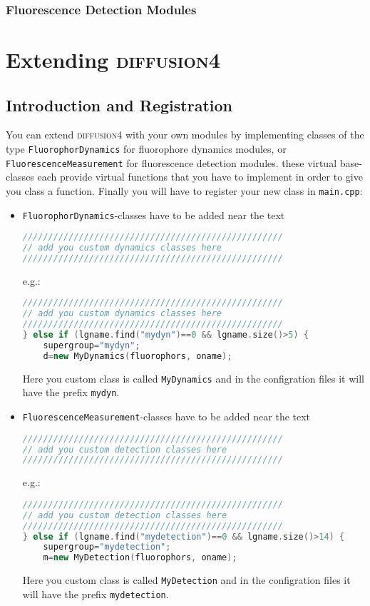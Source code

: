 \documentclass[a4paper,twoside,10pt]{report}
\newcommand{\df}{\textsc{diffusion4}\xspace}
\begin{document}
\subsection{Fluorescence Detection Modules}
\label{sec:DetectionModules}

\chapter{Extending \df}
\label{sec:ExtendingDf}
\section{Introduction and Registration}
\label{sec:IntroductionAndRegistration}

You can extend \df with your own modules by implementing classes of the type \texttt{FluorophorDynamics} for fluorophore dynamics modules, or \texttt{FluorescenceMeasurement} for fluorescence detection modules. these virtual base-classes each provide virtual functions that you have to implement in order to give you class a function. Finally you will have to register your new class in \texttt{main.cpp}:
\begin{itemize}
	\item \texttt{FluorophorDynamics}-classes have to be added near the text
		\begin{lstlisting}[language=c++] 
///////////////////////////////////////////////////
// add you custom dynamics classes here
///////////////////////////////////////////////////
		\end{lstlisting}	
		e.g.:
		\begin{lstlisting}[language=c++] 
///////////////////////////////////////////////////
// add you custom dynamics classes here
///////////////////////////////////////////////////
} else if (lgname.find("mydyn")==0 && lgname.size()>5) {
	supergroup="mydyn";
	d=new MyDynamics(fluorophors, oname);
		\end{lstlisting}	
		Here you custom class is called \texttt{MyDynamics} and in the configration files it will have the prefix \texttt{mydyn}.
	\item \texttt{FluorescenceMeasurement}-classes have to be added near the text
		\begin{lstlisting}[language=c++] 
///////////////////////////////////////////////////
// add you custom detection classes here
///////////////////////////////////////////////////
		\end{lstlisting}	
		e.g.:
		\begin{lstlisting}[language=c++] 
///////////////////////////////////////////////////
// add you custom detection classes here
///////////////////////////////////////////////////
} else if (lgname.find("mydetection")==0 && lgname.size()>14) {
	supergroup="mydetection";
	m=new MyDetection(fluorophors, oname);
		\end{lstlisting}	
		Here you custom class is called \texttt{MyDetection} and in the configration files it will have the prefix \texttt{mydetection}.
		
\end{itemize}
\end{document}
